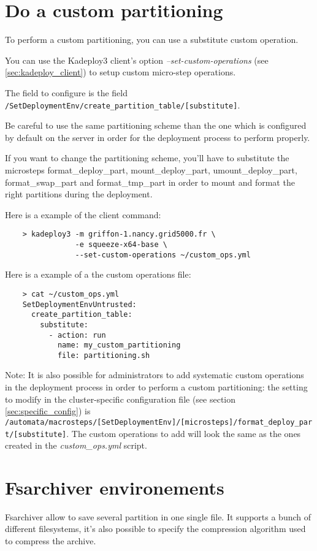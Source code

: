 \documentclass[a4wide,10pt,oneside]{book}
\newcommand{\ypath}[1]{\texttt{#1}}
\begin{document}
\section{Do a custom partitioning}\label{sec:custom-partitioning}
To perform a custom partitioning, you can use a substitute custom operation.

You can use the Kadeploy3 client's option \emph{--set-custom-operations} (see \ref{sec:kadeploy_client}) to setup custom micro-step operations.

The field to configure is the field \ypath{/SetDeploymentEnv/create\_partition\_table/[substitute]}.

Be careful to use the same partitioning scheme than the one which is configured by default on the server in order for the deployment process to perform properly.

If you want to change the partitioning scheme, you'll have to substitute the microsteps format\_deploy\_part, mount\_deploy\_part, umount\_deploy\_part, format\_swap\_part and format\_tmp\_part in order to mount and format the right partitions during the deployment.

Here is a example of the client command:
\begin{verbatim}
    > kadeploy3 -m griffon-1.nancy.grid5000.fr \
                -e squeeze-x64-base \
                --set-custom-operations ~/custom_ops.yml
\end{verbatim}

Here is a example of a the custom operations file:
\begin{small}
\begin{verbatim}
    > cat ~/custom_ops.yml
    SetDeploymentEnvUntrusted:
      create_partition_table:
        substitute:
          - action: run
            name: my_custom_partitioning
            file: partitioning.sh
\end{verbatim}
\end{small}

Note: It is also possible for administrators to add systematic custom operations in the deployment process in order to perform a custom partitioning: the setting to modify in the cluster-specific configuration file (see section \ref{sec:specific_config}) is \ypath{/automata/macrosteps/[SetDeploymentEnv]/[microsteps]/format\_deploy\_part/[substitute]}. The custom operations to add will look the same as the ones created in the \emph{custom\_ops.yml} script.


\section{Fsarchiver environements}\label{sec:fsa}
Fsarchiver allow to save several partition in one single file. It supports a bunch of different filesystems, it's also possible to specify the compression algorithm used to compress the archive.
\end{document}
